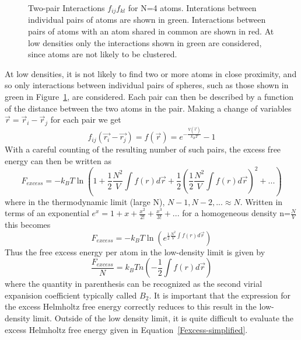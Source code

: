 \documentclass[12pt]{article}
\begin{document}
  \begin{figure}[h!]
    \centering
    \caption{Two-pair Interactions $f_{ij}f_{kl}$ for N=4 atoms. Interations between individual pairs of atoms are shown in green. 
             Interactions between pairs of atoms with an atom shared in common are shown in red. 
             At low densities only the interactions shown in green are considered, since atoms are not likely to be clustered.}
    \label{fig:diagrammic}
  \end{figure}

At low densities, it is not likely to find two or more atoms in close proximity, and so only interactions between individual pairs of spheres, such as those shown in green in Figure~\ref{fig:diagrammic}, are considered.
Each pair can then be described by a function of the distance between the two atoms in the pair. Making a change of variables $\vec{r}=\vec{r}_i-\vec{r}_j $ for each pair we get 
\begin{equation}f_{ij}(\vec{r_i}-\vec{r_j})=f(\vec{r})=e^{-\frac{V(\vec{r})}{k_BT}}-1\end{equation} 
\color{black}
With a careful counting of the resulting number of such pairs, the excess free energy can then be written as 
\begin{equation}{F_{excess}=-k_BT\ln\left(1+\frac{1}{2}\frac{N^2}{V}\int{f(r)}{d\vec{r}}+\frac{1}{2}\left(\frac{1}{2}\frac{N^2}{V}\int{f(r)}{d\vec{r}}\right)^2+ ...\right)}\end{equation}
where in the thermodynamic limit (large N), $N-1, N-2, ...\approx{N}$. 
Written in terms of an exponential $e^x=1+x+\frac{x^2}{2!}+\frac{x^3}{3!}+ ...$ for a homogeneous density n=$\frac{N}{V}$ this becomes
\begin{equation}{F_{excess}=-k_BT\ln{\left(e^{\frac{1}{2}\frac{N^2}{V}\int{f(r)}{d\vec{r}}}\right)}}\end{equation} 
Thus the free excess energy per atom in the low-density limit is given by 
\begin{equation}{\frac{F_{excess}}{N}=k_BTn\left(-\frac{1}{2}\int{f(r)}{d\vec{r}}\right)}\end{equation} where the quantity in parenthesis can be recognized 
as the second virial expanision coefficient typically called $B_2$. %
It is important that the expression for the excess Helmholtz free energy correctly reduces to this result in the low-density limit. 
Outside of the low density limit, it is quite difficult to evaluate the excess Helmholtz free energy given in Equation~\ref{Fexcess-simplified}. 
\end{document}
